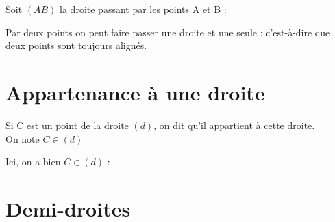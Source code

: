\documentclass[11pt]{article}
\begin{document}
\begin{exemple}
Soit $(AB)$ la droite passant par les points A et B : \\
\end{exemple}

\begin{propriete}
  Par deux points on peut faire passer une droite et une seule : c'est-à-dire que deux points sont toujours alignés.
\end{propriete}

\section{Appartenance à une droite}

\begin{definition}
Si C est un point de la droite $(d)$, on dit qu'il appartient à cette droite. \\
On note $C\in (d)$
\end{definition}

\begin{exemple}
Ici, on a bien $C \in (d)$ : \\
\end{exemple}

\section{Demi-droites}
\end{document}
